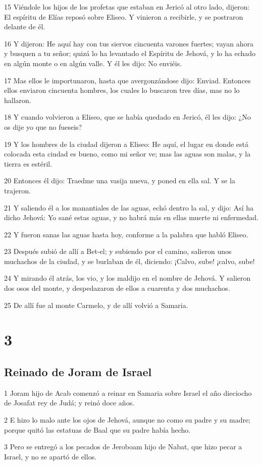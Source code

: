 \par 15 Viéndole los hijos de los profetas que estaban en Jericó al otro lado, dijeron: El espíritu de Elías reposó sobre Eliseo. Y vinieron a recibirle, y se postraron delante de él.
\par 16 Y dijeron: He aquí hay con tus siervos cincuenta varones fuertes; vayan ahora y busquen a tu señor; quizá lo ha levantado el Espíritu de Jehová, y lo ha echado en algún monte o en algún valle. Y él les dijo: No enviéis.
\par 17 Mas ellos le importunaron, hasta que avergonzándose dijo: Enviad. Entonces ellos enviaron cincuenta hombres, los cuales lo buscaron tres días, mas no lo hallaron.
\par 18 Y cuando volvieron a Eliseo, que se había quedado en Jericó, él les dijo: ¿No os dije yo que no fueseis?
\par 19 Y los hombres de la ciudad dijeron a Eliseo: He aquí, el lugar en donde está colocada esta ciudad es bueno, como mi señor ve; mas las aguas son malas, y la tierra es estéril.
\par 20 Entonces él dijo: Traedme una vasija nueva, y poned en ella sal. Y se la trajeron.
\par 21 Y saliendo él a los manantiales de las aguas, echó dentro la sal, y dijo: Así ha dicho Jehová: Yo sané estas aguas, y no habrá más en ellas muerte ni enfermedad.
\par 22 Y fueron sanas las aguas hasta hoy, conforme a la palabra que habló Eliseo.
\par 23 Después subió de allí a Bet-el; y subiendo por el camino, salieron unos muchachos de la ciudad, y se burlaban de él, diciendo: ¡Calvo, sube! ¡calvo, sube!
\par 24 Y mirando él atrás, los vio, y los maldijo en el nombre de Jehová. Y salieron dos osos del monte, y despedazaron de ellos a cuarenta y dos muchachos.
\par 25 De allí fue al monte Carmelo, y de allí volvió a Samaria.

\chapter{3}

\section*{Reinado de Joram de Israel}

\par 1 Joram hijo de Acab comenzó a reinar en Samaria sobre Israel el año dieciocho de Josafat rey de Judá; y reinó doce años.
\par 2 E hizo lo malo ante los ojos de Jehová, aunque no como su padre y su madre; porque quitó las estatuas de Baal que su padre había hecho.
\par 3 Pero se entregó a los pecados de Jeroboam hijo de Nabat, que hizo pecar a Israel, y no se apartó de ellos.

